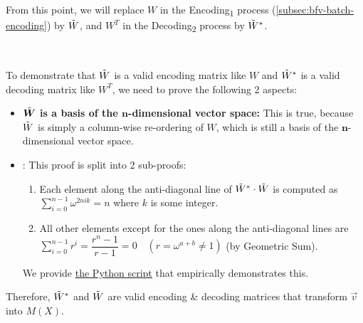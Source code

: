 $ $

$ $

From this point, we will replace $W$ in the \textsf{Encoding\textsubscript{1}} process (\autoref{subsec:bfv-batch-encoding}) by $\tilde{W}$, and $W^T$ in the \textsf{Decoding\textsubscript{2}} process by $\tilde{W}^*$. 

$ $

To demonstrate that $\tilde{W}$ is a valid encoding matrix like $W$ and $\tilde{W}^*$ is a valid decoding matrix like $W^T$, we need to prove the following 2 aspects:
\begin{itemize}[leftmargin=3\parindent]

\item \textbf{${\tilde{\bm W}}$ is a basis of the $\bm{n}$-dimensional vector space:} This is true, because $\tilde{W}$ is simply a column-wise re-ordering of $W$, which is still a basis of the $\bm{n}$-dimensional vector space.

\item {}: This proof is split into 2 sub-proofs: 
\begin{enumerate}[leftmargin=2\parindent]
\item {} Each element along the anti-diagonal line of \boldmath$\tilde{ W}^{ *} \cdot \tilde{ W}$ is computed as $\sum\limits_{i=0}^{n-1} \omega^{2nik} = n$ where $k$ is some integer.
\item {} All other elements except for the ones along the anti-diagonal lines are $\sum\limits_{i=0}^{n-1}r^i=\dfrac{r^n-1}{r-1}=0\quad(r=\omega^{a+b}\ne1)$ (by Geometric Sum).
\end{enumerate}

We provide \href{https://github.com/wang2000star/fhe-textbook-cn/blob/chinese-edition/source%20code/bfv_j_matrix_inverse_proof.py}{\underline{the Python script}} that empirically demonstrates this.

\end{itemize}




Therefore, $\tilde{W}^*$ and $\tilde{W}$ are valid encoding \& decoding matrices that transform $\vec{v}$ into $M(X)$. 

$ $

